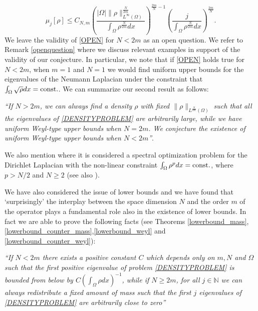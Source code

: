 \documentclass[11pt,a4paper]{amsart}
\numberwithin{equation}{section}
\begin{document}
\begin{equation}\label{PARTIAL2}
\mu_j[\rho]\leq C_{N,m}\left(\frac{|\Omega|\|\rho\|_{L^{\infty}(\Omega)}^{\frac{N}{2m}}}{\int_{\Omega}\rho^{\frac{N}{2m}}dx}\right)^{\frac{2m}{N}-1}\left(\frac{j}{\int_{\Omega}\rho^{\frac{N}{2m}}dx}\right)^{\frac{2m}{N}}.
\end{equation}
We leave the validity of \eqref{OPEN} for $N<2m$ as an open question. We refer to Remark \ref{openquestion} where we discuss relevant examples in support of the validity of our conjecture. In particular, we note that if \eqref{OPEN} holds true for $N<2m$, when $m=1$ and $N=1$ we would find uniform upper bounds for the eigenvalues of the Neumann Laplacian under the constraint that $\int_{\Omega}\sqrt{\rho}dx={\rm const.}$. We can summarize our second result as follows:

 {\it ``If $N>2m$, we can always find a density $\rho$ with fixed $\|\rho\|_{L^{\frac{N}{2m}}(\Omega)}$ such that all the eigenvalues of \eqref{DENSITYPROBLEM} are arbitrarily large, while we have uniform Weyl-type upper bounds when $N=2m$. We conjecture the existence of uniform Weyl-type upper bounds when $N<2m$''}.

We also mention \cite[\S\,9.2.3]{Henrot} where it is considered a spectral optimization problem for the Dirichlet Laplacian with the non-linear constraint $\int_{\Omega}\rho^p dx={\rm const.}$, where $p>N/2$ and $N\geq 2$ (see also \cite[\S\,5]{egorov}).







We have also considered the issue of lower bounds and we have found that `surprisingly' the interplay between the space dimension $N$ and the order $m$ of the operator plays a fundamental role also in the existence of lower bounds. In fact we are able to prove the following facts (see Theorems \ref{lowerbound_mass},\ref{lowerbound_counter_mass},\ref{lowerbound_weyl} and \ref{lowerbound_counter_weyl}):

{\it ``If $N<2m$ there exists a positive constant $C$ which depends only on $m,N$ and $\Omega$ such that the first positive eigenvalue of problem \eqref{DENSITYPROBLEM}  is bounded from below by $C\left(\int_{\Omega}\rho dx\right)^{-1}$, while if $N\geq 2m$, for all $j\in\mathbb N$ we can always redistribute a fixed amount of mass such that the first $j$ eigenvalues of \eqref{DENSITYPROBLEM} are arbitrarily close to zero''}
\end{document}
